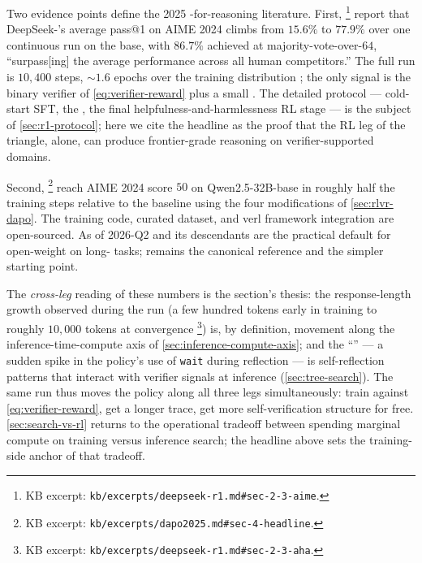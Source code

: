 Two evidence points define the 2025 -for-reasoning literature.
First, \citet[\S 2.3]{deepseek-r1}\footnote{KB excerpt:
\texttt{kb/excerpts/deepseek-r1.md\#sec-2-3-aime}.} report that
DeepSeek-'s average pass@1 on AIME 2024 climbs from $15.6\%$ to
$77.9\%$ over one continuous  run on the  base, with
$86.7\%$ achieved at majority-vote-over-$64$, ``surpass[ing] the
average performance across all human competitors.'' The full run is
$10{,}400$ steps, $\sim\!1.6$ epochs over the training distribution
\citep[\S 2.1]{deepseek-r1}; the only signal is the binary verifier of
\cref{eq:verifier-reward} plus a small . The detailed
protocol --- cold-start SFT, the , the final
helpfulness-and-harmlessness RL stage --- is the subject of
\cref{sec:r1-protocol}; here we cite the headline as the proof that
the RL leg of the triangle, alone, can produce frontier-grade reasoning
on verifier-supported domains.

Second, \citet[\S 4]{dapo2025}\footnote{KB excerpt:
\texttt{kb/excerpts/dapo2025.md\#sec-4-headline}.} reach AIME 2024
score $50$ on Qwen2.5-32B-base in roughly half the training steps
relative to the  baseline using the four modifications of
\cref{sec:rlvr-dapo}. The training code, curated dataset, and verl
framework integration are open-sourced. As of 2026-Q2  and its
descendants are the practical default for open-weight  on long-
tasks;  remains the canonical reference and the simpler starting
point.

The \emph{cross-leg} reading of these numbers is the section's thesis:
the response-length growth observed during the  run (a few
hundred tokens early in training to roughly $10{,}000$ tokens at
convergence \citep[\S 2.3]{deepseek-r1}\footnote{KB excerpt:
\texttt{kb/excerpts/deepseek-r1.md\#sec-2-3-aha}.}) is, by definition,
movement along the inference-time-compute axis of
\cref{sec:inference-compute-axis}; and the ``'' --- a sudden
spike in the policy's use of \texttt{wait} during reflection --- is
self-reflection patterns that interact with verifier signals at
inference (\cref{sec:tree-search}). The same  run thus moves the
policy along all three legs simultaneously: train against
\cref{eq:verifier-reward}, get a longer trace, get more
self-verification structure for free. \cref{sec:search-vs-rl} returns
to the operational tradeoff between spending marginal compute on 
training versus inference search; the headline above sets the
training-side anchor of that tradeoff.

